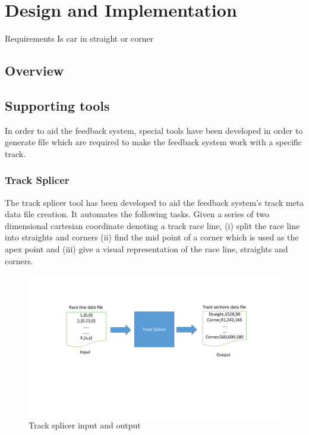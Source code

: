 \section{Design and Implementation}

Requirements
Is car in straight or corner

\subsection{Overview}


\subsection{Supporting tools}
In order to aid the feedback system, special tools have been developed in order to generate file which are required to make the feedback system work with a specific track.


\subsubsection{Track Splicer}
The track splicer tool has been developed to aid the feedback system's track meta data file creation. It automates the following tasks. Given a series of two dimensional cartesian coordinate denoting a track race line, (i) split the race line into straights and corners (ii) find the mid point of a corner which is used as the apex point and (iii) give a visual representation of the race line, straights and corners. 

\begin{figure}[!htb]
	\centering
	\includegraphics[width=\textwidth]{diagrams/trackspliceinputoutput.pdf}
	\caption[track splicer input out]{Track splicer input and output}
	\label{fig:diagram-trackspliceinputoutput}
\end{figure}

